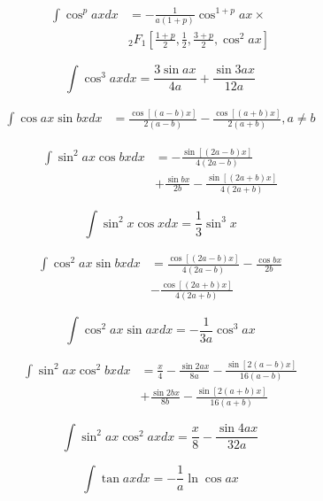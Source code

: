 \documentclass[11pt, letterpaper, notitlepage]{article}
\begin{document}
\begin{multicols}{2}
\begin{footnotesize}
\begin{align}
\int \cos^p ax dx & = -\frac{1}{a(1+p)}{\cos^{1+p} ax} \times 
\nonumber \\ &
{_2F_1}\left[
\frac{1+p}{2}, \frac{1}{2}, \frac{3+p}{2}, \cos^2 ax
\right] 
\end{align}

\begin{equation}
\int \cos^3 ax dx = \frac{3 \sin ax}{4a}+\frac{ \sin 3ax}{12a} 
\end{equation}

\begin{align}
\int \cos ax \sin bx dx &= \frac{\cos[(a-b) x]}{2(a-b)} -
 \frac{\cos[(a+b)x]}{2(a+b)} , a\ne b
\end{align}

\begin{align}
\int \sin^2 ax \cos bx dx &= 
-\frac{\sin[(2a-b)x]}{4(2a-b)} \nonumber \\ & 
+ \frac{\sin bx}{2b} 
- \frac{\sin[(2a+b)x]}{4(2a+b)}
\end{align}

\begin{equation}
\int \sin^2 x \cos x dx = \frac{1}{3} \sin^3 x
\end{equation}

\begin{align}
\int \cos^2 ax \sin bx dx &= \frac{\cos[(2a-b)x]}{4(2a-b)} 
- \frac{\cos bx}{2b}
\nonumber \\ &
 - \frac{\cos[(2a+b)x]}{4(2a+b)}
\end{align}

\begin{equation}
\int \cos^2 ax \sin ax dx = -\frac{1}{3a}\cos^3{ax} 
\end{equation}

\begin{align}
\int \sin^2 ax \cos^2 bx dx &= \frac{x}{4}
-\frac{\sin 2ax}{8a}-
\frac{\sin[2(a-b)x]}{16(a-b)}
\nonumber \\ &
+\frac{\sin 2bx}{8b}-
\frac{\sin[2(a+b)x]}{16(a+b)}
\end{align}

\begin{equation}
\int \sin^2 ax \cos^2 ax dx = \frac{x}{8}-\frac{\sin 4ax}{32a}
\end{equation}

\begin{equation}
\int \tan ax dx = -\frac{1}{a} \ln \cos ax 
\end{equation}


\end{footnotesize}
\end{multicols}
\end{document}

